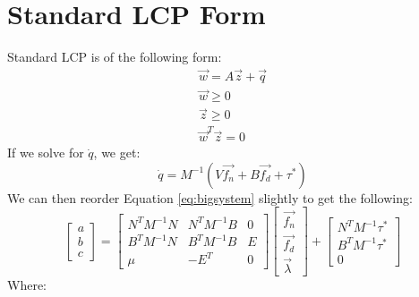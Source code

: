 \section{Standard LCP Form}
Standard LCP is of the following form:
\begin{equation}
\begin{array}{cc}
\vec{w} = A\vec{z} + \vec{q} \\
\vec{w} \geq 0 \\
\vec{z} \geq 0 \\
\vec{w}^T\vec{z} = 0
\end{array}
\end{equation}
If we solve for $\dot{q}$, we get:
\begin{equation}
\dot{q} = M^{-1}(V\vec{f_n} + B\vec{f_d} + \tau^*)
\end{equation}
We can then reorder Equation \ref{eq:bigsystem} slightly to get the following:
\begin{equation}
\label{eq:slcp0}
\left[\begin{matrix}a \\ b \\ c\end{matrix}\right] = \left[\begin{matrix}N^TM^{-1}N & N^TM^{-1}B & 0 \\ B^TM^{-1}N & B^TM^{-1}B & E \\ \mu & -E^T & 0\end{matrix}\right]\left[\begin{matrix}\vec{f_n} \\ \vec{f_d} \\ \vec{\lambda}\end{matrix}\right] + \left[\begin{matrix}N^TM^{-1}\tau^* \\ B^TM^{-1}\tau^* \\ 0\end{matrix}\right]
\end{equation}
Where:
